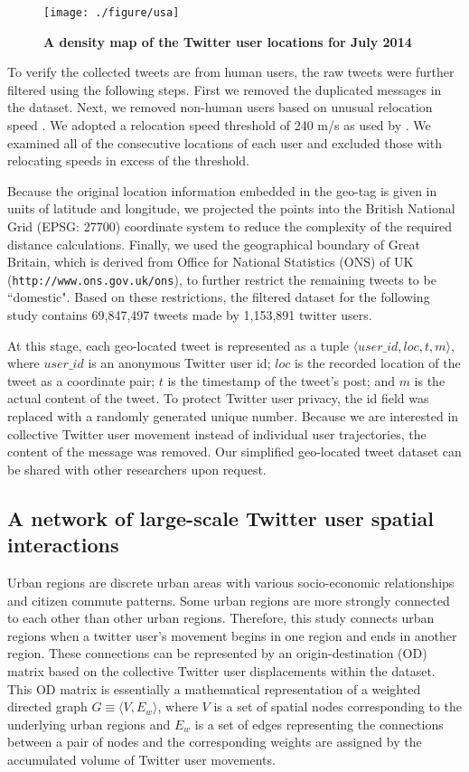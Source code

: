 \documentclass[]{tGIS2e}
\begin{document}
\begin{figure}[ht]
\begin{center}
\texttt{[image: ./figure/usa]}
\caption{\bfseries{A density map of the Twitter user locations for July 2014}}
\label{S2_Fig}
\end{center}
\end{figure}

To verify the collected tweets are from human users, the raw tweets were further filtered using the following steps.
First we removed the duplicated messages in the dataset.
Next, we removed non-human users based on unusual relocation speed \citep{hawelka,jurdak2015}. 
We adopted a relocation speed threshold of 240 m/s as used by \citep{jurdak2015}. 
We examined all of the consecutive locations of each user and excluded those with relocating speeds in excess of the threshold.

Because the original location information embedded in the geo-tag is given in units of latitude and longitude, we projected the points into the British National Grid (EPSG: 27700) coordinate system to reduce the complexity of the required distance calculations. 
Finally, we used the geographical boundary of Great Britain, which is derived from Office for National Statistics (ONS) of UK ({\tt{http://www.ons.gov.uk/ons}}), to further restrict the remaining tweets to be ``domestic".
Based on these restrictions, the filtered dataset for the following study contains 69,847,497 tweets made by 1,153,891 twitter users.

At this stage, each geo-located tweet is represented as a tuple $\langle user\_id, loc, t, m \rangle$, where $user\_id$ is an anonymous Twitter user id; $loc$ is the recorded location of the tweet as a coordinate pair; $t$ is the timestamp of the tweet's post; and $m$ is the actual content of the tweet. 
To protect Twitter user privacy, the id field was replaced with a randomly generated unique number. 
Because we are interested in collective Twitter user movement instead of individual user trajectories, the content of the message was removed. 
Our simplified geo-located tweet dataset can be shared with other researchers upon request.

\subsection{A network of large-scale Twitter user spatial interactions}
Urban regions are discrete urban areas with various socio-economic relationships and citizen commute patterns. 
Some urban regions are more strongly connected to each other than other urban regions.
Therefore, this study connects urban regions when a twitter user's movement begins in one region and ends in another region.
These connections can be represented by an origin-destination (OD) matrix based on the collective Twitter user displacements within the dataset.
This OD matrix is essentially a mathematical representation of a weighted directed graph $G\equiv\langle V, E_{w}\rangle$, where $V$ is a set of spatial nodes corresponding to the underlying urban regions and $E_{w}$ is a set of edges representing the connections between a pair of nodes and the corresponding weights are assigned by the accumulated volume of Twitter user movements.
\end{document}
